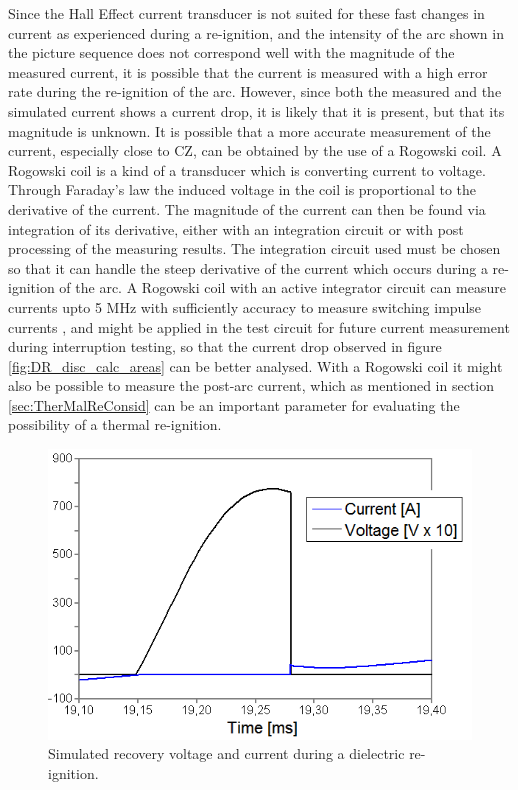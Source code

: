 \documentclass[10pt,b5paper,twoside]{article}
\begin{document}
Since the Hall Effect current transducer is not suited for these fast changes in current as experienced during a re-ignition, and the intensity of the arc shown in the picture sequence does not correspond well with the magnitude of the measured current, it is possible that the current is measured with a high error rate during the re-ignition of the arc. However, since both the measured and the simulated current shows a current drop, it is likely that it is present, but that its magnitude is unknown. It is possible that a more accurate measurement of the current, especially close to CZ, can be obtained by the use of a Rogowski coil. A Rogowski coil is a kind of a transducer which is converting current to voltage. Through Faraday's law the induced voltage in the coil is proportional to the derivative of the current. The magnitude of the current can then be found via integration of its derivative, either with an integration circuit or with post processing of the measuring results. The integration circuit used must be chosen so that it can handle the steep derivative of the current which occurs during a re-ignition of the arc. A Rogowski coil with an active integrator circuit can measure currents upto 5 MHz with sufficiently accuracy to measure switching impulse currents \cite{bib:SwitchingImpulseCurrent}, and might be applied in the test circuit for future current measurement during interruption testing, so that the current drop observed in figure \ref{fig:DR_disc_calc_areas} can be better analysed. With a Rogowski coil it might also be possible to measure the post-arc current, which as mentioned in section \ref{sec:TherMalReConsid} can be an important parameter for evaluating the possibility of a thermal re-ignition.

\begin{figure}[H]
\centering
\includegraphics[scale=0.65]{Bilder/Results/ATPdraw_Over_CurrentandVoltage_2_label.png}
\caption{Simulated recovery voltage and current during a dielectric re-ignition.} \label{fig:DR_ATP_OVER}
\end{figure}
\end{document}

